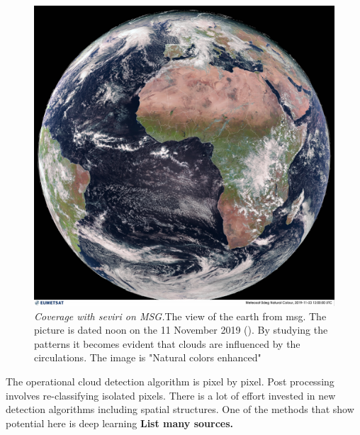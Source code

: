 \begin{figure}[h]
    \centering
    \includegraphics[scale=0.11]{Chapter2_Theory/images/MET10_RGBNatColourEnhncd_FullResolution_20191123120000.jpg}    
    \caption{\textit{Coverage with \acrshort{seviri} on MSG.}The view of the earth from \acrshort{msg}. The picture is dated noon on the 11 November 2019 (\cite{eumetcast_image_gallery}). By studying the patterns it becomes evident that clouds are influenced by the circulations. The image is "Natural colors enhanced"}
    \label{fig:sat_view}
\end{figure}
The operational cloud detection algorithm is pixel by pixel. Post processing involves re-classifying isolated pixels. There is a lot of effort invested in new detection algorithms including spatial structures. One of the methods that show potential here is deep learning \textbf{List many sources.}



